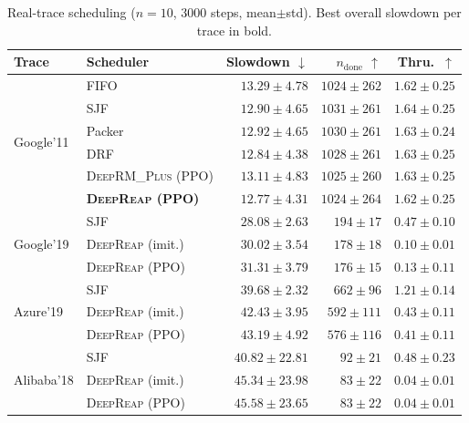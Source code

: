 \documentclass[runningheads]{llncs}
\newcommand{\deeprm}{\textsc{DeepRM\_Plus}}
\newcommand{\deepreap}{\textsc{DeepReap}}
\begin{document}
\begin{table}[!htbp]
\centering
\caption{Real-trace scheduling ($n{=}10$, $3000$ steps, mean$\pm$std).
Best overall slowdown per trace in bold.}
\label{tab:real}
\footnotesize
\setlength{\tabcolsep}{3.2pt}
\begin{tabular}{l l r r r}
\toprule
Trace & Scheduler & Slowdown $\downarrow$ & $n_{\mathrm{done}}$ $\uparrow$ & Thru.\ $\uparrow$ \\
\midrule
\multirow{6}{*}{Google'11}
 & FIFO & $13.29{\pm}4.78$ & $1024{\pm}262$ & $1.62{\pm}0.25$ \\
 & SJF & $12.90{\pm}4.65$ & $1031{\pm}261$ & $1.64{\pm}0.25$ \\
 & Packer & $12.92{\pm}4.65$ & $1030{\pm}261$ & $1.63{\pm}0.24$ \\
 & DRF & $12.84{\pm}4.38$ & $1028{\pm}261$ & $1.63{\pm}0.25$ \\
 & \deeprm{} (PPO) & $13.11{\pm}4.83$ & $1025{\pm}260$ & $1.63{\pm}0.25$ \\
 & \textbf{\deepreap{} (PPO)} & $\mathbf{12.77{\pm}4.31}$ & $1024{\pm}264$ & $1.62{\pm}0.25$ \\
\midrule
\multirow{3}{*}{Google'19}
 & SJF & $\mathbf{28.08{\pm}2.63}$ & $194{\pm}17$ & $0.47{\pm}0.10$ \\
 & \deepreap{} (imit.) & $30.02{\pm}3.54$ & $178{\pm}18$ & $0.10{\pm}0.01$ \\
 & \deepreap{} (PPO) & $31.31{\pm}3.79$ & $176{\pm}15$ & $0.13{\pm}0.11$ \\
\midrule
\multirow{3}{*}{Azure'19}
 & SJF & $\mathbf{39.68{\pm}2.32}$ & $662{\pm}96$ & $1.21{\pm}0.14$ \\
 & \deepreap{} (imit.) & $42.43{\pm}3.95$ & $592{\pm}111$ & $0.43{\pm}0.11$ \\
 & \deepreap{} (PPO) & $43.19{\pm}4.92$ & $576{\pm}116$ & $0.41{\pm}0.11$ \\
\midrule
\multirow{3}{*}{Alibaba'18}
 & SJF & $\mathbf{40.82{\pm}22.81}$ & $92{\pm}21$ & $0.48{\pm}0.23$ \\
 & \deepreap{} (imit.) & $45.34{\pm}23.98$ & $83{\pm}22$ & $0.04{\pm}0.01$ \\
 & \deepreap{} (PPO) & $45.58{\pm}23.65$ & $83{\pm}22$ & $0.04{\pm}0.01$ \\
\bottomrule
\end{tabular}
\end{table}
\end{document}
